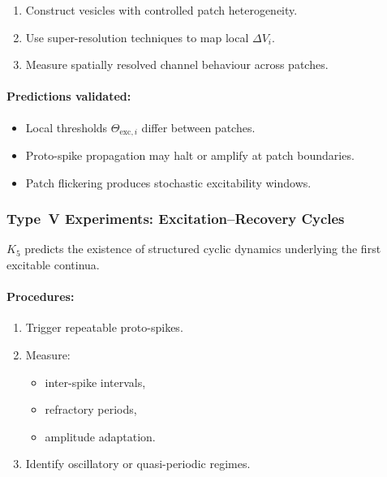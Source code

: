 \begin{enumerate}
    \item Construct vesicles with controlled patch heterogeneity.
    \item Use super-resolution techniques to map local $\Delta V_i$.
    \item Measure spatially resolved channel behaviour across patches.
\end{enumerate}

\paragraph{Predictions validated:}

\begin{itemize}
    \item Local thresholds $\Theta_{\mathrm{exc},i}$ differ between patches.
    \item Proto-spike propagation may halt or amplify at patch boundaries.
    \item Patch flickering produces stochastic excitability windows.
\end{itemize}



\subsubsection{Type~V Experiments: Excitation--Recovery Cycles}

$K_5$ predicts the existence of structured cyclic dynamics 
underlying the first excitable continua.

\paragraph{Procedures:}

\begin{enumerate}
    \item Trigger repeatable proto-spikes.
    \item Measure:
          \begin{itemize}
              \item inter-spike intervals,
              \item refractory periods,
              \item amplitude adaptation.
          \end{itemize}
    \item Identify oscillatory or quasi-periodic regimes.
\end{enumerate}

